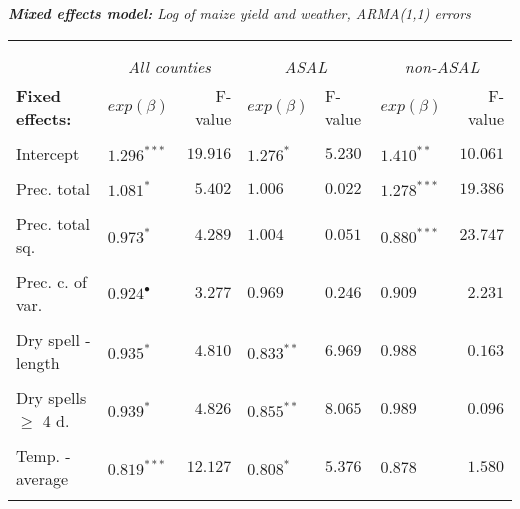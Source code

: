 \documentclass[a4paper,12pt]{article}
\begin{document}
\FloatBarrier
\pagebreak




{
\begin{threeparttable}
\singlespacing
\caption{\textit{\textbf{Mixed  effects model:} Log of maize yield and weather, ARMA(1,1) errors}}
\label{KenARe11} 
\begin{footnotesize}

\begin{tabular}{llrlllr} 

\hline \vspace{-0.2cm} \\
\vspace{-0.2cm} \\
  \multicolumn{1}{l}{\vspace{0.1cm}\textbf{ }}  &\multicolumn{2}{c}{\textit{All counties}} &\multicolumn{2}{c}{\textit{ASAL}} &\multicolumn{2}{c}{\textit{non-ASAL}}\\
    \multicolumn{1}{l}{\vspace{0.1cm}\textbf{Fixed effects:}}&$exp(\beta)$&F-value\tnote{a}%
    &$exp(\beta)$&F-value\tnote{a}&$exp(\beta)$&F-value\tnote{a}\\
 \hline 
\hline
\\
\vspace{-0.2cm}Intercept&$1.296^{***}$&$19.916$&$1.276^{*}$&$5.230$&$1.410^{**}$&$10.061$\\
  \\
\vspace{-0.2cm}Prec. total&$1.081^{*}$&$5.402$&$1.006^{}$&$0.022$&$1.278^{***}$&$19.386$\\
  \\
  \vspace{-0.2cm}Prec. total sq.&$0.973^{*}$&$4.289$&$1.004$&$0.051$&$0.880^{***}$&$23.747$\\
    \\
      \vspace{-0.2cm}Prec. c. of var.&$0.924^{\bullet}$&$3.277$&$0.969$ &$0.246$&$0.909^{}$&$2.231$\\
  \\

         \vspace{-0.2cm}Dry spell -length&$0.935^{*}$&$4.810$&$0.833^{**}$&$6.969$&$ 0.988^{}$&$0.163$\\
  \\
        \vspace{-0.2cm}Dry spells 	$\geq$ 4 d.&$0.939^{*}$&$4.826$&$0.855^{**}$&$8.065$&$0.989^{}$&$0.096$\\
  \\
          \vspace{-0.2cm}Temp. - average&$0.819^{***}$&$12.127$&$0.808^{*}$&$5.376$&$0.878$ $^{}$&$1.580$\\
  \\
  

\end{tabular}
\end{footnotesize}
\end{threeparttable}}
\end{document}
